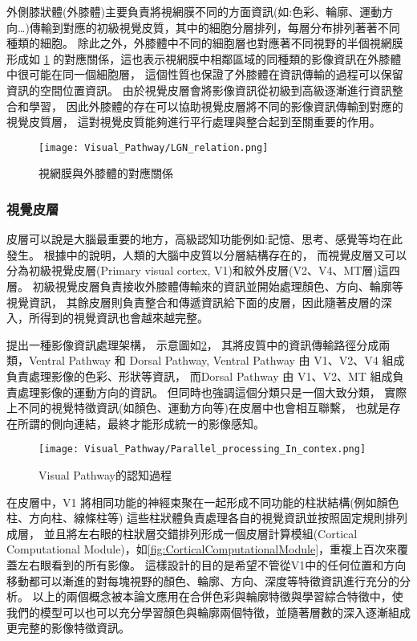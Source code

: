 \documentclass[class=NCU_thesis, crop=false]{standalone}
\begin{document}
外側膝狀體(外膝體)主要負責將視網膜不同的方面資訊(如:色彩、輪廓、運動方向…)傳輸到對應的初級視覺皮質，其中的細胞分層排列，每層分布排列著著不同種類的細胞。
除此之外，外膝體中不同的細胞層也對應著不同視野的半個視網膜形成如 \cref{fig:LGN_Relation}
的對應關係，這也表示視網膜中相鄰區域的同種類的影像資訊在外膝體中很可能在同一個細胞層，
這個性質也保證了外膝體在資訊傳輸的過程可以保留資訊的空間位置資訊。
由於視覺皮層會將影像資訊從初級到高級逐漸進行資訊整合和學習，
因此外膝體的存在可以協助視覺皮層將不同的影像資訊傳輸到對應的視覺皮質層，
這對視覺皮質能夠進行平行處理與整合起到至關重要的作用。

\begin{figure}[H]
  \centering
  \texttt{[image: Visual\_Pathway/LGN\_relation.png]}
  \caption{視網膜與外膝體的對應關係~\cite{bear2016neuroscience}}
  \label{fig:LGN_Relation}
\end{figure}
\pagebreak

\subsubsection{視覺皮層}
皮層可以說是大腦最重要的地方，高級認知功能例如:記憶、思考、感覺等均在此發生。
根據\cite{1180370208}中的說明，人類的大腦中皮質以分層結構存在的，
而視覺皮層又可以分為初級視覺皮層(Primary visual cortex, V1)和紋外皮層(V2、V4、MT層)這四層。
初級視覺皮層負責接收外膝體傳輸來的資訊並開始處理顏色、方向、輪廓等視覺資訊，
其餘皮層則負責整合和傳遞資訊給下面的皮層，因此隨著皮層的深入，所得到的視覺資訊也會越來越完整。

\cite{1180370208}提出一種影像資訊處理架構，
示意圖如\cref{fig:ParallelProcess}，
其將皮質中的資訊傳輸路徑分成兩類，Ventral Pathway 和 Dorsal Pathway, 
Ventral Pathway 由 V1、V2、V4 組成負責處理影像的色彩、形狀等資訊，
而Dorsal Pathway 由 V1、V2、MT 組成負責處理影像的運動方向的資訊。
但同時也強調這個分類只是一個大致分類，
實際上不同的視覺特徵資訊(如顏色、運動方向等)在皮層中也會相互聯繫，
也就是存在所謂的側向連結，最終才能形成統一的影像感知。

\begin{figure}[H]
  \centering
  \texttt{[image: Visual\_Pathway/Parallel\_processing\_In\_contex.png]}
  \caption{Visual Pathway的認知過程~\cite{1180370208}}
  \label{fig:ParallelProcess}
\end{figure}

在皮層中，V1 將相同功能的神經束聚在一起形成不同功能的柱狀結構(例如顏色柱、方向柱、線條柱等)
這些柱狀體負責處理各自的視覺資訊並按照固定規則排列成層，
並且將左右眼的柱狀層交錯排列形成一個皮層計算模組(Cortical Computational Module)，如\cref{fig:CorticalComputationalModule}，重複上百次來覆蓋左右眼看到的所有影像。
這樣設計的目的是希望不管從V1中的任何位置和方向移動都可以漸進的對每塊視野的顏色、輪廓、方向、深度等特徵資訊進行充分的分析。
以上的兩個概念被本論文應用在合併色彩與輪廓特徵與學習綜合特徵中，使我們的模型可以也可以充分學習顏色與輪廓兩個特徵，並隨著層數的深入逐漸組成更完整的影像特徵資訊。
\end{document}
